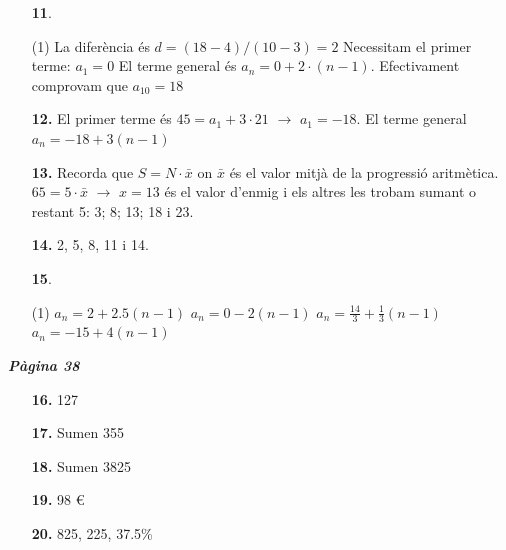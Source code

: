 \documentclass[a4paper, pdf, twoside]{book}
\begin{document}
\begin{multicols}{2}
\begin{enumerate}

 \item[\fontfamily{phv}\selectfont\color{blue}\textbf{11}. ] 
 \begin{tasks}[column-sep=1em, item-indent=1.3333em](1)
	 \task* La diferència és $d=(18-4)/(10-3)=2$
	 \task* Necessitam el primer terme: $a_1=0$ El terme general és $a_n=0+2\cdot (n-1)$. Efectivament comprovam que $a_{10}=18$
\end{tasks}
\vspace{0.25cm}
\item[\fontfamily{phv}\selectfont\color{blue}\textbf{12. }] 
El primer terme és $45=a_1+3\cdot 21$ $\rightarrow $ $a_1 =-18$. El terme general $a_n=-18+3(n-1)$
\vspace{0.25cm}
\item[\fontfamily{phv}\selectfont\color{blue}\textbf{13. }] 
Recorda que $S=N\cdot \bar x$ on $\bar x$ és el valor mitjà de la progressió aritmètica. $65=5\cdot \bar x$ $\rightarrow $ $x=13$ és el valor d'enmig i els altres les trobam sumant o restant 5: 3; 8; 13; 18 i 23.
\vspace{0.25cm}
\item[\fontfamily{phv}\selectfont\color{blue}\textbf{14. }] 
2, 5, 8, 11 i 14.
\vspace{0.25cm}



 \item[\fontfamily{phv}\selectfont\color{blue}\textbf{15}. ] 
 \begin{tasks}[column-sep=1em, item-indent=1.3333em](1)
	 \task $a_n=2+2.5(n-1)$
	 \task $a_n=0-2(n-1)$
	 \task* $a_n=\frac {14}{3}+\frac {1}{3}(n-1)$
	 \task $a_n=-15+4(n-1)$
\end{tasks}
 \end{enumerate}
\vspace{0.3cm}


{\textbf{\em Pàgina 38}} \hrulefill
\begin{enumerate}
\vspace{0.25cm}
\item[\fontfamily{phv}\selectfont\color{blue}\textbf{16. }] 
127
 \end{enumerate}
\begin{enumerate}
\vspace{0.25cm}
\item[\fontfamily{phv}\selectfont\color{blue}\textbf{17. }]  \scalebox{0.6}{\simbolclau } 
Sumen 355
\vspace{0.25cm}
\item[\fontfamily{phv}\selectfont\color{blue}\textbf{18. }]  \scalebox{0.6}{\simbolclau } 
Sumen 3825
\vspace{0.25cm}
\item[\fontfamily{phv}\selectfont\color{blue}\textbf{19. }]  \scalebox{0.6}{\simbolclau } 
98 \euro {}
\vspace{0.25cm}
\item[\fontfamily{phv}\selectfont\color{blue}\textbf{20. }] 
825, 225, 37.5\%
\vspace{0.25cm}



\end{enumerate}
\end{multicols}
\end{document}
